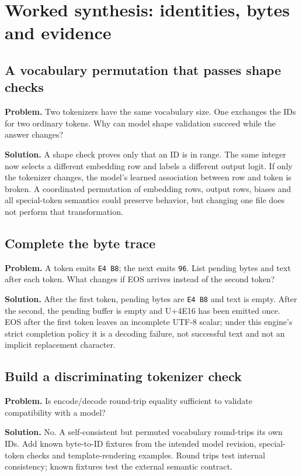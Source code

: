 \section{Worked synthesis: identities, bytes and evidence}
\subsection{A vocabulary permutation that passes shape checks}
\textbf{Problem.} Two tokenizers have the same vocabulary size. One exchanges
the IDs for two ordinary tokens. Why can model shape validation succeed while
the answer changes?

\textbf{Solution.} A shape check proves only that an ID is in range. The same
integer now selects a different embedding row and labels a different output
logit. If only the tokenizer changes, the model's learned association between
row and token is broken. A coordinated permutation of embedding rows,
output rows, biases and all special-token semantics could preserve behavior,
but changing one file does not perform that transformation.

\subsection{Complete the byte trace}
\textbf{Problem.} A token emits \texttt{E4 B8}; the next emits \texttt{96}.
List pending bytes and text after each token. What changes if EOS arrives
instead of the second token?

\textbf{Solution.} After the first token, pending bytes are
\texttt{E4 B8} and text is empty. After the second, the pending buffer is empty
and U+4E16 has been emitted once. EOS after the first token leaves an incomplete
UTF-8 scalar; under this engine's strict completion policy it is a decoding
failure, not successful text and not an implicit replacement character.

\subsection{Build a discriminating tokenizer check}
\textbf{Problem.} Is encode/decode round-trip equality sufficient to validate
compatibility with a model?

\textbf{Solution.} No. A self-consistent but permuted vocabulary round-trips its
own IDs. Add known byte-to-ID fixtures from the intended model revision,
special-token checks and template-rendering examples. Round trips test internal
consistency; known fixtures test the external semantic contract.
